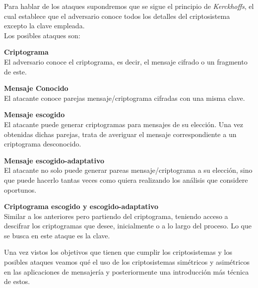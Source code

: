 Para hablar de los ataques supondremos que se sigue el principio de \emph{Kerckhoffs}, el cual establece que el adversario conoce todos los detalles del criptosistema excepto la clave empleada.\\
Los posibles ataques son:
\begin{description}
		\item \textbf{Criptograma}\\ El adversario conoce el criptograma, es decir, el mensaje cifrado o un fragmento de este.
		\item \textbf{Mensaje Conocido}\\ El atacante conoce parejas mensaje/criptograma cifradas con una misma clave.
		\item \textbf{Mensaje escogido}\\ El atacante puede generar criptogramas para mensajes de su elección. Una vez obtenidas dichas parejas, trata de averiguar el mensaje correspondiente a un criptograma desconocido.
		\item \textbf{Mensaje escogido-adaptativo}\\ El atacante no solo puede generar pareas mensaje/criptograma a su elección, sino que puede hacerlo tantas veces como quiera realizando los análisis que considere oportunos.
		\item \textbf{Criptograma escogido y escogido-adaptativo}\\ Similar a los anteriores pero partiendo del criptograma, teniendo acceso a descifrar los criptogramas que desee, inicialmente o a lo largo del proceso. Lo que se busca en este ataque es la clave.
\end{description}

Una vez vistos los objetivos que tienen que cumplir los criptosistemas y los posibles ataques veamos qué el uso de los criptosistemas simétricos y asimétricos en las aplicaciones de mensajería y posteriormente una introducción más técnica de estos.\\

